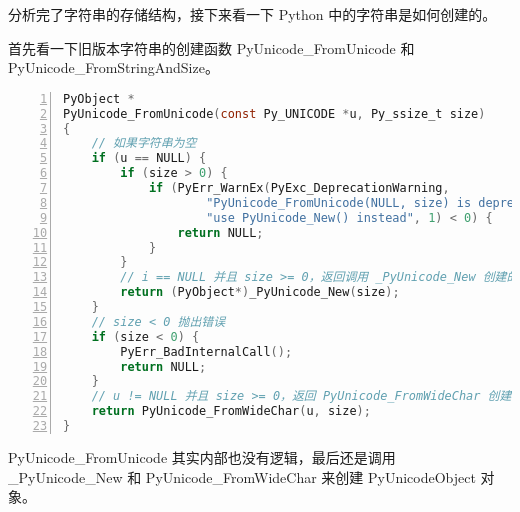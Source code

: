分析完了字符串的存储结构，接下来看一下 Python 中的字符串是如何创建的。

首先看一下旧版本字符串的创建函数 PyUnicode\_FromUnicode 和 PyUnicode\_FromStringAndSize。

\begin{lstlisting}[language=C, numbers=left, numbersep=1em, numberstyle=\footnotesize , breaklines=true]
PyObject *
PyUnicode_FromUnicode(const Py_UNICODE *u, Py_ssize_t size)
{
    // 如果字符串为空
    if (u == NULL) {
        if (size > 0) {
            if (PyErr_WarnEx(PyExc_DeprecationWarning,
                    "PyUnicode_FromUnicode(NULL, size) is deprecated; "
                    "use PyUnicode_New() instead", 1) < 0) {
                return NULL;
            }
        }
        // i == NULL 并且 size >= 0，返回调用 _PyUnicode_New 创建的字符串
        return (PyObject*)_PyUnicode_New(size);
    }
	// size < 0 抛出错误
    if (size < 0) {
        PyErr_BadInternalCall();
        return NULL;
    }
	// u != NULL 并且 size >= 0，返回 PyUnicode_FromWideChar 创建的字符串
    return PyUnicode_FromWideChar(u, size);
}
\end{lstlisting}

PyUnicode\_FromUnicode 其实内部也没有逻辑，最后还是调用 \_PyUnicode\_New 和 PyUnicode\_FromWideChar 来创建
PyUnicodeObject 对象。

